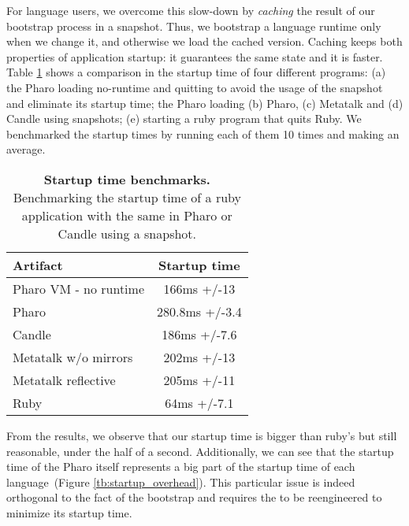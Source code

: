 For language users, we overcome this slow-down by \emph{caching} the result of our bootstrap process in a snapshot. Thus, we bootstrap a language runtime only when we change it, and otherwise we load the cached version. Caching keeps both properties of application startup: it guarantees the same state and it is faster. Table \ref{tb:startup} shows a comparison in the startup time of four different programs: (a) the Pharo \VM loading no-runtime and quitting to avoid the usage of the snapshot and eliminate its startup time; the Pharo \VM loading (b) Pharo, (c) Metatalk and (d) Candle using snapshots; (e) starting a ruby program that quits Ruby. We benchmarked the startup times by running each of them 10 times and making an average.

\begin{table}[ht]
 	\centering
 	\begin{tabular}{lc}
			\toprule
			\textbf{Artifact}
 			& \textbf{Startup time}\\
		\toprule
		Pharo VM - no runtime &  166ms +/-13 \\\midrule
		Pharo & 280.8ms +/-3.4\\\midrule
		Candle & 186ms +/-7.6\\\midrule
		Metatalk w/o mirrors &202ms +/-13\\\midrule
		Metatalk reflective &205ms +/-11\\\bottomrule
		Ruby &  64ms +/-7.1\\\midrule
 	\end{tabular}
	\vspace*{0.2cm}
 	\caption{\small\textbf{Startup time benchmarks.} Benchmarking the startup time of a ruby application with the same in Pharo or Candle using a snapshot.\label{tb:startup}}
 \end{table}
 
From the results, we observe that our startup time is bigger than ruby's but still reasonable, under the half of a second. Additionally, we can see that the startup time of the Pharo \VM itself represents a big part of the startup time of each language~(Figure \ref{tb:startup_overhead}). This particular issue is indeed orthogonal to the fact of the bootstrap and requires the \VM to be reengineered to minimize its startup time.
 

